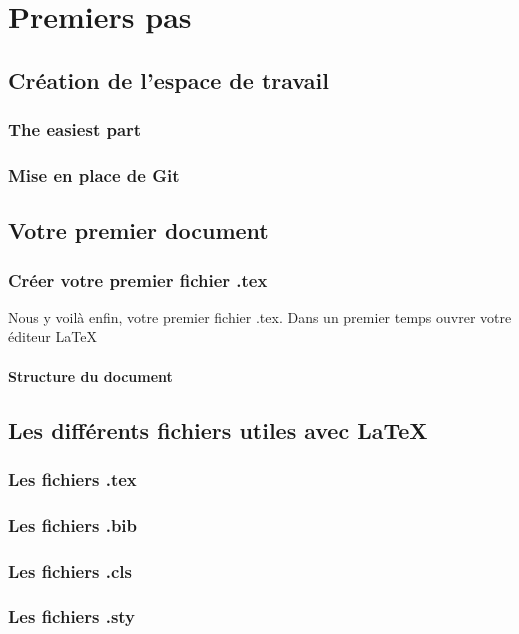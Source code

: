 \documentclass[../main.tex]{subfiles}
\begin{document}
\chapter{Premiers pas}

\section{Création de l'espace de travail}

\subsection{The easiest part}

\subsection{Mise en place de Git}

\section{Votre premier document}

\subsection{Créer votre premier fichier .tex}

Nous y voilà enfin, votre premier fichier .tex. Dans un premier temps ouvrer votre éditeur \LaTeX



\subsubsection{Structure du document}

\section{Les différents fichiers utiles avec \LaTeX}

\subsection{Les fichiers .tex}

\subsection{Les fichiers .bib}

\subsection{Les fichiers .cls}

\subsection{Les fichiers .sty}
\end{document}
